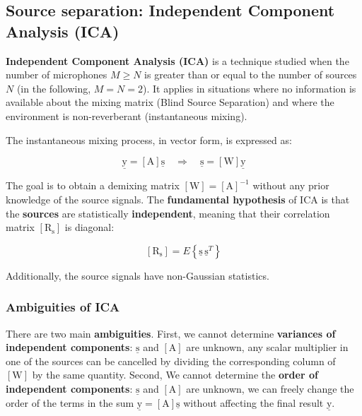 \subsection{Source separation: Independent Component Analysis (ICA)}
\textbf{Independent Component Analysis (ICA)} is a technique studied when the number of microphones $M \geq N$ is greater than or equal to the number of sources $N$ (in the following, $M = N = 2$).
It applies in situations where no information is available about the mixing matrix (Blind Source Separation) and where the environment is non-reverberant (instantaneous mixing).

\clearpage

The instantaneous mixing process, in vector form, is expressed as:

\[
\underline{\mathrm{y}} = \left[\mathrm{A}\right] \underline{\mathrm{s}}
\quad \Rightarrow \quad
\underline{\mathrm{s}} = \left[\mathrm{W}\right] \underline{\mathrm{y}}
\]

The goal is to obtain a demixing matrix $\left[\mathrm{W}\right] = \left[\mathrm{A}\right]^{-1}$ without any prior knowledge of the source signals.
The \textbf{fundamental hypothesis} of ICA is that the \textbf{sources} are statistically \textbf{independent}, meaning that their correlation matrix $\left[\mathrm{R}_{\mathrm{s}}\right]$ is diagonal:

\[
\left[\mathrm{R}_{\mathrm{s}}\right] = E\left\{ \underline{\mathrm{s}} \, \underline{\mathrm{s}}^{T} \right\}
\]

Additionally, the source signals have non-Gaussian statistics.

\subsubsection{Ambiguities of ICA}

There are two main \textbf{ambiguities}.
First, we cannot determine \textbf{variances of independent components}: $\underline{\mathrm{s}}$ and $\left[\mathrm{A}\right]$ are unknown, any scalar multiplier in one of the sources can be cancelled by dividing the corresponding column of $\left[\mathrm{W}\right]$ by the same quantity.
Second, We cannot determine the \textbf{order of independent components}: $\underline{\mathrm{s}}$ and $\left[\mathrm{A}\right]$ are unknown, we can freely change the order of the terms in the sum $ \underline{\mathrm{y}} = \left[\mathrm{A}\right] \underline{\mathrm{s}} $
without affecting the final result $\underline{\mathrm{y}}$.

